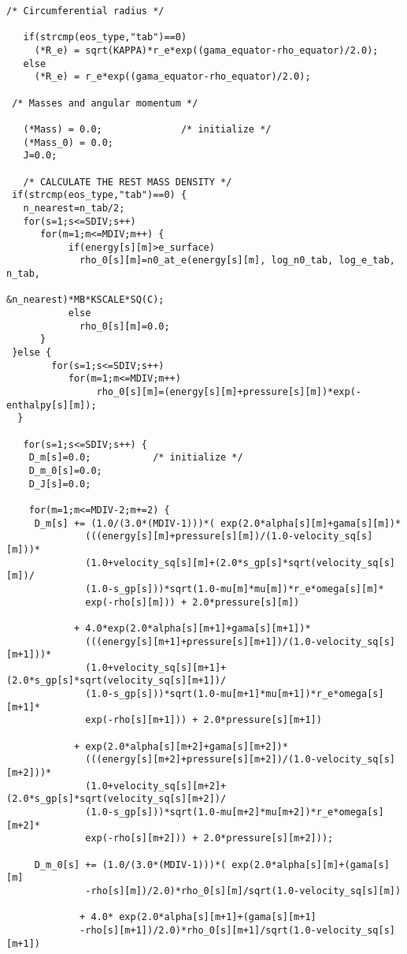\begin{verbatim}
/* Circumferential radius */

   if(strcmp(eos_type,"tab")==0)
     (*R_e) = sqrt(KAPPA)*r_e*exp((gama_equator-rho_equator)/2.0);
   else
     (*R_e) = r_e*exp((gama_equator-rho_equator)/2.0);

 /* Masses and angular momentum */
 
   (*Mass) = 0.0;              /* initialize */
   (*Mass_0) = 0.0;
   J=0.0;

   /* CALCULATE THE REST MASS DENSITY */
 if(strcmp(eos_type,"tab")==0) {
   n_nearest=n_tab/2;
   for(s=1;s<=SDIV;s++)
      for(m=1;m<=MDIV;m++) {
           if(energy[s][m]>e_surface)
             rho_0[s][m]=n0_at_e(energy[s][m], log_n0_tab, log_e_tab, n_tab,
                                             &n_nearest)*MB*KSCALE*SQ(C);
           else
             rho_0[s][m]=0.0;
      }  
 }else {
        for(s=1;s<=SDIV;s++)
           for(m=1;m<=MDIV;m++)
                rho_0[s][m]=(energy[s][m]+pressure[s][m])*exp(-enthalpy[s][m]);
  }

   for(s=1;s<=SDIV;s++) {
    D_m[s]=0.0;           /* initialize */
    D_m_0[s]=0.0;
    D_J[s]=0.0;

    for(m=1;m<=MDIV-2;m+=2) {
     D_m[s] += (1.0/(3.0*(MDIV-1)))*( exp(2.0*alpha[s][m]+gama[s][m])*
              (((energy[s][m]+pressure[s][m])/(1.0-velocity_sq[s][m]))*
              (1.0+velocity_sq[s][m]+(2.0*s_gp[s]*sqrt(velocity_sq[s][m])/
              (1.0-s_gp[s]))*sqrt(1.0-mu[m]*mu[m])*r_e*omega[s][m]*
              exp(-rho[s][m])) + 2.0*pressure[s][m])

            + 4.0*exp(2.0*alpha[s][m+1]+gama[s][m+1])*
              (((energy[s][m+1]+pressure[s][m+1])/(1.0-velocity_sq[s][m+1]))*
              (1.0+velocity_sq[s][m+1]+(2.0*s_gp[s]*sqrt(velocity_sq[s][m+1])/
              (1.0-s_gp[s]))*sqrt(1.0-mu[m+1]*mu[m+1])*r_e*omega[s][m+1]*
              exp(-rho[s][m+1])) + 2.0*pressure[s][m+1]) 

            + exp(2.0*alpha[s][m+2]+gama[s][m+2])*
              (((energy[s][m+2]+pressure[s][m+2])/(1.0-velocity_sq[s][m+2]))*
              (1.0+velocity_sq[s][m+2]+(2.0*s_gp[s]*sqrt(velocity_sq[s][m+2])/
              (1.0-s_gp[s]))*sqrt(1.0-mu[m+2]*mu[m+2])*r_e*omega[s][m+2]*
              exp(-rho[s][m+2])) + 2.0*pressure[s][m+2]));    

     D_m_0[s] += (1.0/(3.0*(MDIV-1)))*( exp(2.0*alpha[s][m]+(gama[s][m]
              -rho[s][m])/2.0)*rho_0[s][m]/sqrt(1.0-velocity_sq[s][m])

             + 4.0* exp(2.0*alpha[s][m+1]+(gama[s][m+1]
             -rho[s][m+1])/2.0)*rho_0[s][m+1]/sqrt(1.0-velocity_sq[s][m+1])
         

\end{verbatim}
